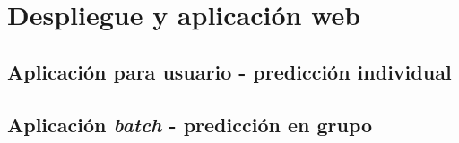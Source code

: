 \chapter{Despliegue y aplicación web}

\section{Aplicación para usuario - predicción individual}

\section{Aplicación \textit{batch} - predicción en grupo}